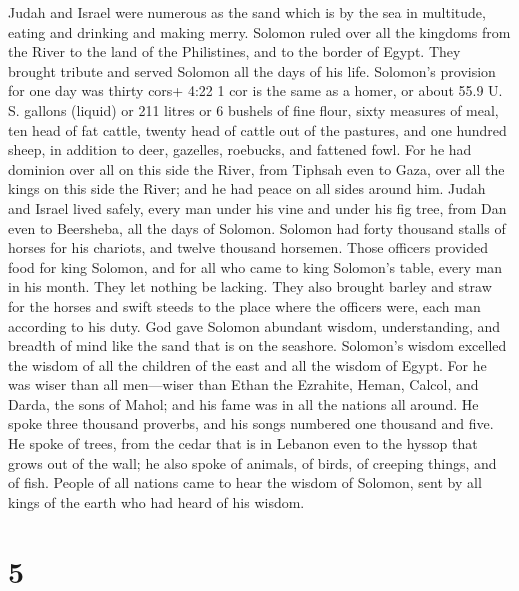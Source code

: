  Judah and Israel were numerous as the sand which is by the
sea in multitude, eating and drinking and making merry. 
Solomon ruled over all the kingdoms from the River to the land of the
Philistines, and to the border of Egypt. They brought tribute and served
Solomon all the days of his life.  Solomon's provision for
one day was thirty cors+ 4:22 1 cor is the same as a homer, or about
55.9 U. S. gallons (liquid) or 211 litres or 6 bushels of fine flour,
sixty measures of meal,  ten head of fat cattle, twenty
head of cattle out of the pastures, and one hundred sheep, in addition
to deer, gazelles, roebucks, and fattened fowl.  For he had
dominion over all on this side the River, from Tiphsah even to Gaza,
over all the kings on this side the River; and he had peace on all sides
around him.  Judah and Israel lived safely, every man under
his vine and under his fig tree, from Dan even to Beersheba, all the
days of Solomon.  Solomon had forty thousand stalls of
horses for his chariots, and twelve thousand horsemen. 
Those officers provided food for king Solomon, and for all who came to
king Solomon's table, every man in his month. They let nothing be
lacking.  They also brought barley and straw for the horses
and swift steeds to the place where the officers were, each man
according to his duty.  God gave Solomon abundant wisdom,
understanding, and breadth of mind like the sand that is on the
seashore.  Solomon's wisdom excelled the wisdom of all the
children of the east and all the wisdom of Egypt.  For he
was wiser than all men---wiser than Ethan the Ezrahite, Heman, Calcol,
and Darda, the sons of Mahol; and his fame was in all the nations all
around.  He spoke three thousand proverbs, and his songs
numbered one thousand and five.  He spoke of trees, from
the cedar that is in Lebanon even to the hyssop that grows out of the
wall; he also spoke of animals, of birds, of creeping things, and of
fish.  People of all nations came to hear the wisdom of
Solomon, sent by all kings of the earth who had heard of his wisdom.

\hypertarget{section-4}{%
\section{5}\label{section-4}}

